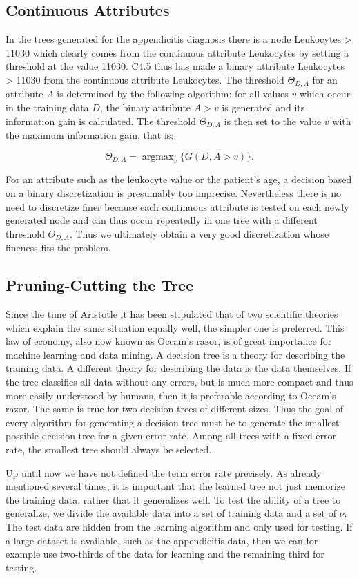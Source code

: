 \documentclass[10pt]{book}
\begin{document}
\subsection{Continuous Attributes}
In the trees generated for the appendicitis diagnosis there is a node Leukocytes > 11030 which clearly comes from the continuous attribute Leukocytes by setting a threshold at the value 11030. C4.5 thus has made a binary attribute Leukocytes > 11030 from the continuous attribute Leukocytes. The threshold $\Theta_{D, A}$ for an attribute $A$ is determined by the following algorithm: for all values $v$ which occur in the training data $D$, the binary attribute $A>v$ is generated and its information gain is calculated. The threshold $\Theta_{D, A}$ is then set to the value $v$ with the maximum information gain, that is:

$$
\Theta_{D, A}=\operatorname{argmax}_{v}\{G(D, A>v)\} .
$$

For an attribute such as the leukocyte value or the patient's age, a decision based on a binary discretization is presumably too imprecise. Nevertheless there is no need to discretize finer because each continuous attribute is tested on each newly generated node and can thus occur repeatedly in one tree with a different threshold $\Theta_{D, A}$. Thus we ultimately obtain a very good discretization whose fineness fits the problem.

\subsection{Pruning-Cutting the Tree}
Since the time of Aristotle it has been stipulated that of two scientific theories which explain the same situation equally well, the simpler one is preferred. This law of economy, also now known as Occam's razor, is of great importance for machine learning and data mining.
A decision tree is a theory for describing the training data. A different theory for describing the data is the data themselves. If the tree classifies all data without any errors, but is much more compact and thus more easily understood by humans, then it is preferable according to Occam’s razor. The same is true for two decision trees of different sizes. Thus the goal of every algorithm for generating a decision tree must be to generate the smallest possible decision tree for a given error rate. Among all trees with a fixed error rate, the smallest tree should always be selected.

Up until now we have not defined the term error rate precisely. As already mentioned several times, it is important that the learned tree not just memorize the training data, rather that it generalizes well. To test the ability of a tree to generalize, we divide the available data into a set of training data and a set of $\nu$. The test data are hidden from the learning algorithm and only used for testing. If a large dataset is available, such as the appendicitis data, then we can for example use two-thirds of the data for learning and the remaining third for testing.
\end{document}
